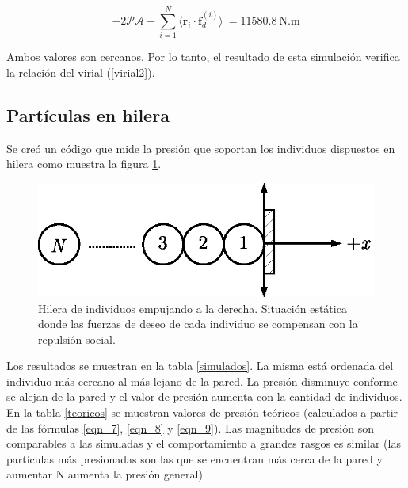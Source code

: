 \begin{equation}
 -2\mathcal{PA} -\displaystyle\sum_{i=1}^N \langle
\mathbf{r}_i\cdot\mathbf{f}_d^{(i)}\rangle\ =  11580.8\ \text{N.m}
\end{equation}

Ambos valores son cercanos. Por lo tanto, el resultado de esta simulación verifica la relación del virial (\ref{virial2}).


\subsection{Partículas en hilera}

Se creó un código que mide la presión que soportan los individuos dispuestos en hilera como muestra la figura \ref{hilera}.  

\begin{figure}[!htbp]
\center
\includegraphics[scale=1]{figuras/hilera.eps}
\caption[width=5cm]{Hilera de individuos empujando a la derecha. Situación estática donde las fuerzas de deseo de cada individuo se compensan con la repulsión social.}
\label{hilera}
\end{figure}

Los resultados se muestran en la tabla \ref{simulados}. La misma está ordenada del individuo más cercano al más lejano de la pared. La presión disminuye conforme se alejan de la pared y el valor de presión aumenta con la cantidad de individuos.\\
En la tabla \ref{teoricos} se muestran valores de presión teóricos (calculados a partir de las fórmulas \ref{eqn_7}, \ref{eqn_8} y \ref{eqn_9}). Las magnitudes de presión son comparables a las simuladas y el comportamiento a grandes rasgos es similar (las partículas más presionadas son las que se encuentran más cerca de la pared y aumentar N aumenta la presión general)  

